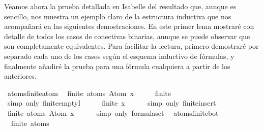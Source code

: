 \begin{isabellebody}
\begin{isamarkuptext}
  Veamos ahora la prueba detallada en Isabelle del resultado que, aunque es sencillo, nos muestra 
  un ejemplo claro de la estructura inductiva que nos acompañará en las siguientes demostraciones.
  En este primer lema mostraré con detalle de todos los casos de conectivas binarias, 
  aunque se puede observar que son completamente equivalentes. Para facilitar la lectura, primero
  demostraré por separado cada uno de los casos según el esquema inductivo de fórmulas, y finalmente
  añadiré la prueba para una fórmula cualquiera a partir de los anteriores.%
\end{isamarkuptext}\isamarkuptrue%
\isamarkupfalse%
\ atoms{\isacharunderscore}finite{\isacharunderscore}atom{\isacharcolon}\isanewline
\ \ {\isachardoublequoteopen}finite\ {\isacharparenleft}atoms\ {\isacharparenleft}Atom\ x{\isacharparenright}{\isacharparenright}{\isachardoublequoteclose}\isanewline
%
\isadelimproof
%
\endisadelimproof
%
\isatagproof
{}\isamarkupfalse%
\ {\isacharminus}\isanewline
\ \ \isamarkupfalse%
\ {\isachardoublequoteopen}finite\ {\isasymemptyset}{\isachardoublequoteclose}\isanewline
\ \ \ \ \isamarkupfalse%
\ {\isacharparenleft}simp\ only{\isacharcolon}\ finite{\isachardot}emptyI{\isacharparenright}\isanewline
\ \ \isamarkupfalse%
\ \isamarkupfalse%
\ {\isachardoublequoteopen}finite\ {\isacharbraceleft}x{\isacharbraceright}{\isachardoublequoteclose}\isanewline
\ \ \ \ \isamarkupfalse%
\ {\isacharparenleft}simp\ only{\isacharcolon}\ finite{\isacharunderscore}insert{\isacharparenright}\isanewline
\ \ \isamarkupfalse%
\ \isamarkupfalse%
\ {\isachardoublequoteopen}finite\ {\isacharparenleft}atoms\ {\isacharparenleft}Atom\ x{\isacharparenright}{\isacharparenright}{\isachardoublequoteclose}\isanewline
\ \ \ \ \isamarkupfalse%
\ {\isacharparenleft}simp\ only{\isacharcolon}\ formula{\isachardot}set{\isacharparenleft}{}{\isacharparenright}{\isacharparenright}\ \isanewline
{}\isamarkupfalse%
%
\endisatagproof
{\isafoldproof}%
%
\isadelimproof
\isanewline
%
\endisadelimproof
\isanewline
{}\isamarkupfalse%
\ atoms{\isacharunderscore}finite{\isacharunderscore}bot{\isacharcolon}\isanewline
\ \ {\isachardoublequoteopen}finite\ {\isacharparenleft}atoms\ {\isasymbottom}{\isacharparenright}{\isachardoublequoteclose}\isanewline
%
\isadelimproof
%
\endisadelimproof
%
\isatagproof
{}\isamarkupfalse%
\ {\isacharminus}\isanewline
\ \ \isamarkupfalse%

\end{isabellebody}
